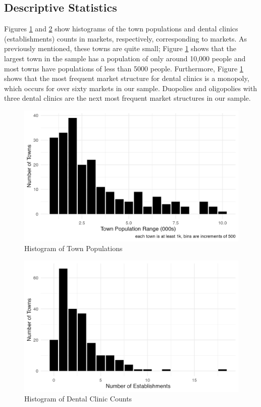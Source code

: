 \documentclass[a4paper,11pt]{article}
\begin{document}
\subsection{Descriptive Statistics}

Figures \ref{figure1} and \ref{figure2} show histograms of the town populations and dental clinics (establishments) counts in markets, respectively, corresponding to markets. As previously mentioned, these towns are quite small; Figure \ref{figure1} shows that the largest town in the sample has a population of only around 10,000 people and most towns have populations of less than 5000 people. Furthermore, Figure \ref{figure1} shows that the most frequent market structure for dental clinics is a monopoly, which occurs for over sixty markets in our sample. Duopolies and oligopolies with three dental clinics are the next most frequent market structures in our sample.

\begin{figure}
    \centering
    \includegraphics[width=0.85\linewidth]{figure2.png}
    \caption{Histogram of Town Populations}
    \label{figure1}
\end{figure}

\begin{figure}
    \centering
    \includegraphics[width=0.85\linewidth]{table2Figure.png}
    \caption{Histogram of Dental Clinic Counts}
    \label{figure2}
\end{figure}
\end{document}
